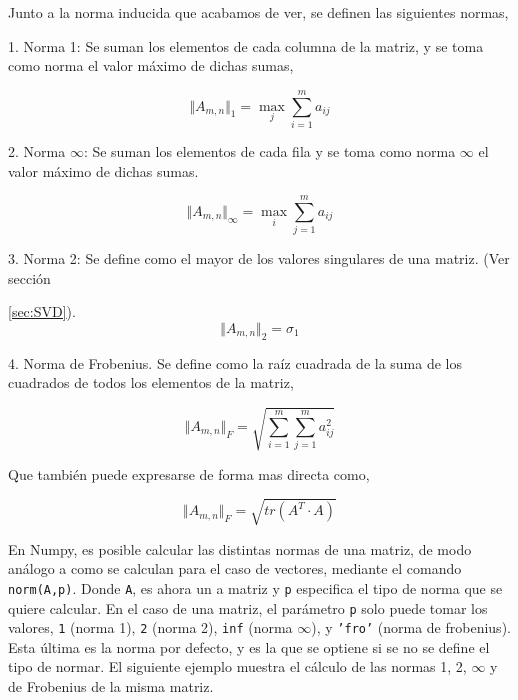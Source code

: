 \begin{paracol}{2}
Junto a la norma inducida que acabamos de ver, se definen las siguientes normas,

1. Norma 1: Se suman los elementos de cada columna de la matriz, y se toma como norma el valor máximo de dichas sumas,
\end{paracol}
\begin{equation*}
\Vert A_{m,n} \Vert _{1} = \max_j \sum_{i=1}^m a_{ij}
\end{equation*}
\begin{paracol}{2}
2. Norma $\infty$: Se suman los elementos de cada fila y se toma como norma $\infty$ el valor máximo de dichas sumas.
\end{paracol}
\begin{equation*}
\Vert A_{m,n} \Vert _{\infty} = \max_i \sum_{j=1}^m a_{ij}
\end{equation*}
\begin{paracol}{2}
3. Norma 2: Se define como el mayor de los valores singulares de una matriz. (Ver sección 
\end{paracol}
\ref{sec:SVD}).
\begin{equation*}
\Vert A_{m,n} \Vert _2 = \sigma_{1}
\end{equation*}
\begin{paracol}{2}
4. Norma de Frobenius. Se define como la raíz cuadrada de la suma de los cuadrados de todos los elementos de la matriz,
\end{paracol}
\begin{equation*}
\Vert A_{m,n} \Vert _F =\sqrt{\sum_{i=1}^m \sum_{j=1}^m a_{ij}^2}
\end{equation*}
\begin{paracol}{2}
Que también puede expresarse de forma mas directa como,
\end{paracol}
\begin{equation*}
\Vert A_{m,n} \Vert _F =\sqrt{tr(A^T\cdot A)}
\end{equation*}
\begin{paracol}{2}
En Numpy, es posible calcular las distintas normas de una matriz, de modo análogo a como se calculan para el caso de vectores,  mediante el comando \texttt{norm(A,p)}. Donde \texttt{A}, es ahora un a matriz y \texttt{p} especifica el tipo de norma que se quiere calcular. En el caso de una matriz, el parámetro \texttt{p} solo puede tomar los valores, \texttt{1} (norma 1), \texttt{2} (norma 2), \texttt{inf} (norma $\infty$), y \texttt{'fro'} (norma de frobenius). Esta última es la norma por defecto, y es la que se optiene si se no se define el tipo de normar. El siguiente ejemplo muestra el cálculo de las normas 1, 2, $\infty$ y de Frobenius de la misma matriz.
\end{paracol}
